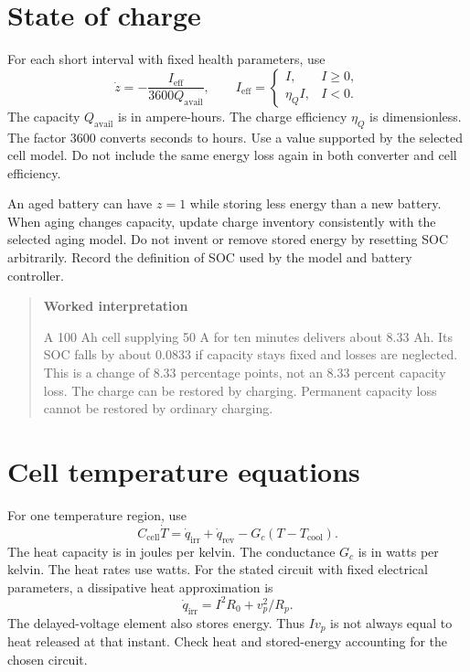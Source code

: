\documentclass[11pt,a4paper]{report}
\newenvironment{readerbox}[1]{\begin{quote}\color{reportblue}\textbf{#1}\par\normalcolor}{\end{quote}}
\begin{document}
\section{State of charge}
For each short interval with fixed health parameters, use
\begin{equation}
\dot z=-\frac{I_{\mathrm{eff}}}{3600Q_{\mathrm{avail}}},\qquad
I_{\mathrm{eff}}=
\begin{cases}
I,& I\geq0,\\
\eta_QI,&I<0.
\end{cases}
\end{equation}
The capacity $Q_{\mathrm{avail}}$ is in ampere-hours.
The charge efficiency $\eta_Q$ is dimensionless.
The factor 3600 converts seconds to hours.
Use a value supported by the selected cell model.
Do not include the same energy loss again in both converter and cell efficiency.

An aged battery can have $z=1$ while storing less energy than a new battery.
When aging changes capacity, update charge inventory consistently with the selected aging model.
Do not invent or remove stored energy by resetting SOC arbitrarily.
Record the definition of SOC used by the model and battery controller.

\begin{readerbox}{Worked interpretation}
A 100 Ah cell supplying 50 A for ten minutes delivers about 8.33 Ah.
Its SOC falls by about 0.0833 if capacity stays fixed and losses are neglected.
This is a change of 8.33 percentage points, not an 8.33 percent capacity loss.
The charge can be restored by charging.
Permanent capacity loss cannot be restored by ordinary charging.
\end{readerbox}

\section{Cell temperature equations}
For one temperature region, use
\begin{equation}
C_{\mathrm{cell}}\dot T=\dot q_{\mathrm{irr}}+\dot q_{\mathrm{rev}}
-G_c(T-T_{\mathrm{cool}}).
\end{equation}
The heat capacity is in joules per kelvin.
The conductance $G_c$ is in watts per kelvin.
The heat rates use watts.
For the stated circuit with fixed electrical parameters, a dissipative heat approximation is
\begin{equation}
\dot q_{\mathrm{irr}}=I^2R_0+v_p^2/R_p.
\end{equation}
The delayed-voltage element also stores energy.
Thus $I v_p$ is not always equal to heat released at that instant.
Check heat and stored-energy accounting for the chosen circuit.
\end{document}
